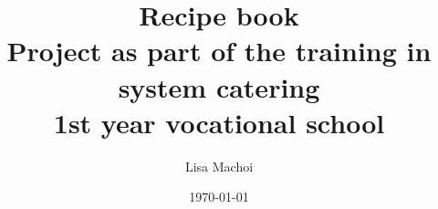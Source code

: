 \documentclass[10pt,a4paper]{article}
\begin{document}
\thispagestyle{empty}
\title{Recipe book\\
	\vspace{1cm}
	{\large Project as part of the training in system catering}\\
	{\small 1st year vocational school}
	\vspace{2cm}
}
\author{Lisa Machoi}
\date{\today}
\maketitle
\newpage
\thispagestyle{empty}
\tableofcontents
\setcounter{page}{0}
%
\newpage
\setcounter{page}{1}


















\end{document}
